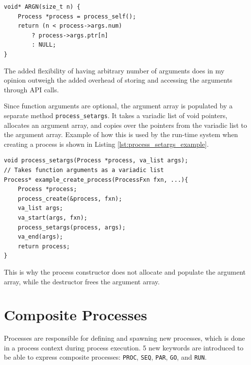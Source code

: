 \noindent\begin{minipage}{\textwidth}
\begin{lstlisting}[style={CustomC},caption={\texttt{ARGN} API function},label={lst:argn_api_call}]
void* ARGN(size_t n) {
    Process *process = process_self();
    return (n < process->args.num)
        ? process->args.ptr[n]
        : NULL;
}
\end{lstlisting}
\end{minipage}

The added flexibility of having arbitrary number of arguments does in my opinion outweigh the added overhead of storing and accessing the arguments through API calls.

Since function arguments are optional, the argument array is populated by a separate meth\-od \texttt{process\_setargs}. It takes a variadic list of void pointers, allocates an argument array, and copies over the pointers from the variadic list to the argument array. Example of how this is used by the run\hyp{}time system when creating a process is shown in Listing \ref{lst:process_setargs_example}.

\noindent\begin{minipage}{\textwidth}
\begin{lstlisting}[style={CustomC},caption={Process creation example example},label={lst:process_setargs_example}]
void process_setargs(Process *process, va_list args);
// Takes function arguments as a variadic list 
Process* example_create_process(ProcessFxn fxn, ...){
    Process *process;
    process_create(&process, fxn);
    va_list args;
    va_start(args, fxn);
    process_setargs(process, args);
    va_end(args);
    return process;
}
\end{lstlisting}
\end{minipage}

This is why the process constructor does not allocate and populate the argument array, while the destructor frees the argument array. 


\section{Composite Processes}
\label{sec:composite_processes}

Processes are responsible for defining and spawning new processes, which is done in a process context during process execution. 5 new keywords are introduced to be able to express composite processes: \texttt{PROC}, \texttt{SEQ}, \texttt{PAR}, \texttt{GO}, and \texttt{RUN}. 


